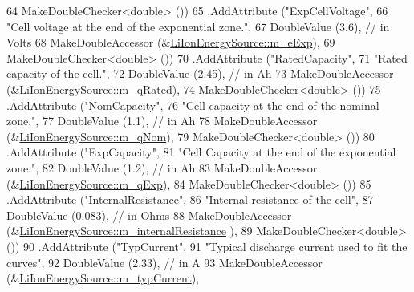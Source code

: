 \begin{DoxyCode}
64                    MakeDoubleChecker<double> ())
65     .AddAttribute (\textcolor{stringliteral}{"ExpCellVoltage"},
66                    \textcolor{stringliteral}{"Cell voltage at the end of the exponential zone."},
67                    DoubleValue (3.6),  \textcolor{comment}{// in Volts}
68                    MakeDoubleAccessor (&\hyperlink{classns3_1_1LiIonEnergySource_a9b4872a3e9793d43b01cf3656666c279}{LiIonEnergySource::m\_eExp}),
69                    MakeDoubleChecker<double> ())
70     .AddAttribute (\textcolor{stringliteral}{"RatedCapacity"},
71                    \textcolor{stringliteral}{"Rated capacity of the cell."},
72                    DoubleValue (2.45),   \textcolor{comment}{// in Ah}
73                    MakeDoubleAccessor (&\hyperlink{classns3_1_1LiIonEnergySource_ae2dcf1fde731b0045ce2d93d13a00ebc}{LiIonEnergySource::m\_qRated}),
74                    MakeDoubleChecker<double> ())
75     .AddAttribute (\textcolor{stringliteral}{"NomCapacity"},
76                    \textcolor{stringliteral}{"Cell capacity at the end of the nominal zone."},
77                    DoubleValue (1.1),  \textcolor{comment}{// in Ah}
78                    MakeDoubleAccessor (&\hyperlink{classns3_1_1LiIonEnergySource_acfca8f1da4a37a00286abf71685b6f3f}{LiIonEnergySource::m\_qNom}),
79                    MakeDoubleChecker<double> ())
80     .AddAttribute (\textcolor{stringliteral}{"ExpCapacity"},
81                    \textcolor{stringliteral}{"Cell Capacity at the end of the exponential zone."},
82                    DoubleValue (1.2),  \textcolor{comment}{// in Ah}
83                    MakeDoubleAccessor (&\hyperlink{classns3_1_1LiIonEnergySource_ad1b19f7503ba9ad3c012303299d38c86}{LiIonEnergySource::m\_qExp}),
84                    MakeDoubleChecker<double> ())
85     .AddAttribute (\textcolor{stringliteral}{"InternalResistance"},
86                    \textcolor{stringliteral}{"Internal resistance of the cell"},
87                    DoubleValue (0.083),  \textcolor{comment}{// in Ohms}
88                    MakeDoubleAccessor (&\hyperlink{classns3_1_1LiIonEnergySource_a7c22bde6de9fb282e4517b45bbae31b9}{LiIonEnergySource::m\_internalResistance}
      ),
89                    MakeDoubleChecker<double> ())
90     .AddAttribute (\textcolor{stringliteral}{"TypCurrent"},
91                    \textcolor{stringliteral}{"Typical discharge current used to fit the curves"},
92                    DoubleValue (2.33), \textcolor{comment}{// in A}
93                    MakeDoubleAccessor (&\hyperlink{classns3_1_1LiIonEnergySource_af4e0f258f6a3a020eae2f695b1d0db9f}{LiIonEnergySource::m\_typCurrent}),

\end{DoxyCode}
